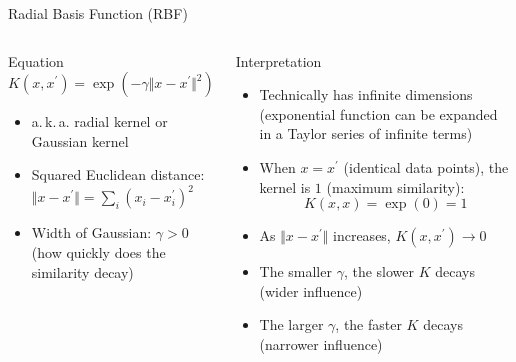 \documentclass[
                en,
                ]{sdqbeamer}
\begin{document}
\begin{frame}{Radial Basis Function (RBF)}
    \begin{columns}
        \column{\kitthreecolumns}
        \begin{greenblock}{Equation}
            \begin{equation*}
                K(x, x^\prime) = \exp(-\gamma \Vert x-x^\prime \Vert^2)
            \end{equation*}

            \begin{itemize}
                \setlength\itemsep{2em}
                \item a.\,k.\,a. radial kernel or Gaussian kernel
                \item Squared Euclidean distance: $\Vert x-x^\prime \Vert = \sum_i (x_i
                    - x_i^\prime)^2$
                \item Width of Gaussian: $\gamma > 0$ (how quickly does the similarity
                    decay)
            \end{itemize}
        \end{greenblock}

        \column{\kitthreecolumns}
        \begin{greenblock}{Interpretation}
            \begin{itemize}
                \item Technically has infinite dimensions (exponential function
                    can be expanded in a Taylor series of infinite terms)
                \item When $x = x^\prime$ (identical data points), the kernel is
                    $1$ (maximum similarity):
                    \begin{equation*}
                        K(x,x) = \exp(0) = 1
                    \end{equation*}
                \item As $\Vert x - x^\prime \Vert$ increases, $K(x, x^\prime)
                    \rightarrow 0$
                \item The smaller $\gamma$, the slower $K$ decays (wider
                    influence)
                \item The larger $\gamma$, the faster $K$ decays (narrower
                    influence)
            \end{itemize}
        \end{greenblock}

    \end{columns}
\end{frame}
\end{document}
